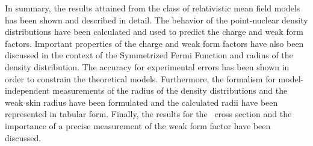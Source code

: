 In summary, the results attained from the class of relativistic mean field models has been shown and described in detail. The behavior of the point-nuclear density distributions have been calculated and used to predict the charge and weak form factors. Important properties of the charge and weak form factors have also been discussed in the context of the Symmetrized Fermi Function and radius of the density distribution. The accuracy for experimental errors has been shown in order to constrain the theoretical models. Furthermore, the formalism for model-independent measurements of the radius of the density distributions and the weak skin radius have been formulated and the calculated radii have been represented in tabular form. Finally, the results for the \cevns\ cross section and the importance of a precise measurement of the weak form factor have been discussed. 